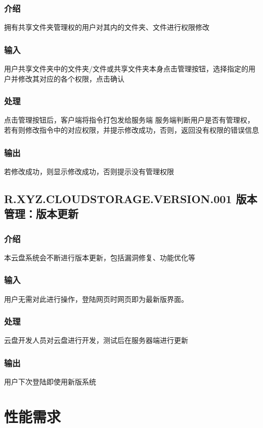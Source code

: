\subsubsection{介绍}
拥有共享文件夹管理权的用户对其内的文件夹、文件进行权限修改

\subsubsection{输入} 
用户共享文件夹中的文件夹/文件或共享文件夹本身点击管理按钮，选择指定的用户并修改其对应的各个权限，点击确认

\subsubsection{处理} 
点击管理按钮后，客户端将指令打包发给服务端
服务端判断用户是否有管理权，若有则修改指令中的对应权限，并提示修改成功，否则，返回没有权限的错误信息

\subsubsection{输出} 
若修改成功，则显示修改成功，否则提示没有管理权限

\subsection{R.XYZ.CLOUDSTORAGE.VERSION.001 版本管理：版本更新}

\subsubsection{介绍}
本云盘系统会不断进行版本更新，包括漏洞修复、功能优化等
\subsubsection{输入} 
用户无需对此进行操作，登陆网页时网页即为最新版界面。

\subsubsection{处理} 
云盘开发人员对云盘进行开发，测试后在服务器端进行更新

\subsubsection{输出} 
用户下次登陆即使用新版系统


\section{性能需求}

